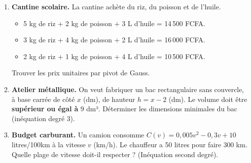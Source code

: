 \documentclass[11pt]{article}
\begin{document}
\begin{exercice}
\begin{enumerate}
    \item \textbf{Cantine scolaire.} La cantine achète du riz, du poisson et de l'huile.
    \begin{itemize}
        \item 5 kg de riz + 2 kg de poisson + 3 L d'huile = 14\,500 FCFA.
        \item 3 kg de riz + 4 kg de poisson + 2 L d'huile = 16\,000 FCFA.
        \item 2 kg de riz + 1 kg de poisson + 4 L d'huile = 10\,500 FCFA.
    \end{itemize}
    Trouver les prix unitaires par pivot de Gauss.
    \item \textbf{Atelier métallique.} On veut fabriquer un bac rectangulaire sans couvercle, à base carrée de côté $x$ (dm), de hauteur $h = x - 2$ (dm). Le volume doit être \textbf{supérieur ou égal à} 9 dm³. Déterminer les dimensions minimales du bac (inéquation degré 3).
    \item \textbf{Budget carburant.} Un camion consomme $C(v) = 0,005v^2 - 0,3v + 10$ litres/100km à la vitesse $v$ (km/h). Le chauffeur a 50 litres pour faire 300 km. Quelle plage de vitesse doit-il respecter ? (Inéquation second degré).
\end{enumerate}
\end{exercice}
\end{document}
